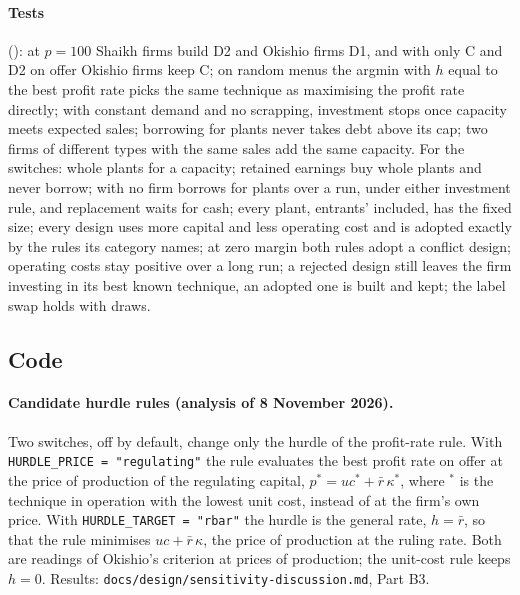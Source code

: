 \paragraph{Tests} (): at $p = 100$ Shaikh firms build D2 and
Okishio firms D1, and with only C and D2 on offer Okishio firms keep C; on random menus the
argmin with $h$ equal to the best profit rate picks the same technique as maximising the
profit rate directly; with constant demand and no scrapping, investment stops once capacity
meets expected sales; borrowing for plants never takes debt above its cap; two firms of
different types with the same sales add the same capacity. For the switches: whole plants
for a capacity; retained earnings buy whole plants and never borrow; with  no firm
borrows for plants over a run, under either investment rule, and replacement waits for cash; every plant, entrants'
included, has the fixed size; every design uses more capital and less operating cost and is
adopted exactly by the rules its category names; at zero margin both rules adopt a conflict
design; operating costs stay positive over a long run; a rejected design still leaves the
firm investing in its best known technique, an adopted one is built and kept; the label
swap holds with draws.

\subsection*{Code}

\paragraph{Candidate hurdle rules (analysis of 8 November 2026).} Two switches, off by default,
change only the hurdle of the profit-rate rule. With \texttt{HURDLE\_PRICE = "regulating"} the
rule evaluates the best profit rate on offer at the price of production of the regulating
capital, $p^* = uc^* + \bar r\,\kappa^*$, where $^*$ is the technique in operation with the lowest
unit cost, instead of at the firm's own price. With \texttt{HURDLE\_TARGET = "rbar"} the hurdle is
the general rate, $h = \bar r$, so that the rule minimises $uc + \bar r\,\kappa$, the price of
production at the ruling rate. Both are readings of Okishio's criterion at prices of production;
the unit-cost rule keeps $h = 0$. Results: \texttt{docs/design/sensitivity-discussion.md}, Part B3.
